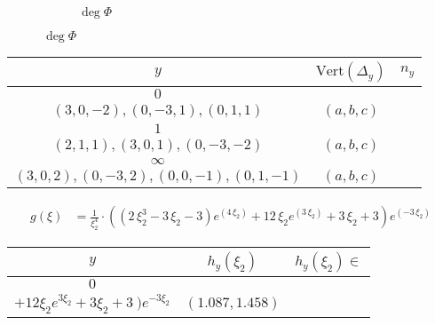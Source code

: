 {\begin{figure}[h]
{\begin{subfigure}[b]{0.40\textwidth}
	\caption*{$\deg \Phi $}
\end{subfigure}
}
\end{figure}
\begin{tabularx}{\textwidth}{|c|c|c}
\toprule
\(y\) & \(\text{Vert}(\Delta_y)\) & \(n_y\) \\
\midrule
\(0\) & \begin{tabular}{l} \((-3,0,1),(-2,1,1),(2,1,-1),\) \\ \hspace{1cm} \((3,0,-2),(0,-3,1),(0,1,1)\) \end{tabular} & \((a,b,c)\) \\ \midrule
\(1\) & \begin{tabular}{l} \((-3,0,1),(-2,1,1),(0,1,0),\) \\ \hspace{1cm} \((2,1,1),(3,0,1),(0,-3,-2)\) \end{tabular} & \((a,b,c)\) \\ \midrule
\(\infty\) & \begin{tabular}{l} \((-3,0,-1),(-2,1,-1),(2,1,1),\) \\ \hspace{1cm} \((3,0,2),(0,-3,2),(0,0,-1),(0,1,-1)\) \end{tabular} & \((a,b,c)\) \\
\midrule
\end{tabularx}
\begin{align*}
g(\xi) &= \frac{1}{\xi_{2}^{4}}\cdot\left({\left(2 \, \xi_{2}^{3} - 3 \, \xi_{2} - 3\right)} e^{\left(4 \, \xi_{2}\right)} + 12 \, \xi_{2} e^{\left(3 \, \xi_{2}\right)} + 3 \, \xi_{2} + 3\right) e^{\left(-3 \, \xi_{2}\right)}
\end{align*}
\begin{tabularx}{\textwidth}{|c|c|c}
\toprule
\(y\) & \( h_y(\xi_2)\) & \( h_y(\xi_2) \in\) \\
\midrule
\(0\) & \begin{tabular}{l} \(\frac{1}{3\xi_2^{4}} \cdot
 ( \ (2   \xi_2^{3} - 3   \xi_2 - 3) e^{4   \xi_2} \)   \\ \hspace{2cm} \(+12 \xi_2 e^{3 \xi_2} + 3 \xi_2 + 3 \ ) e^{-3 \xi_2}\) \end{tabular} & \((1.087,1.458)\) \\ \midrule

\end{tabularx}}
